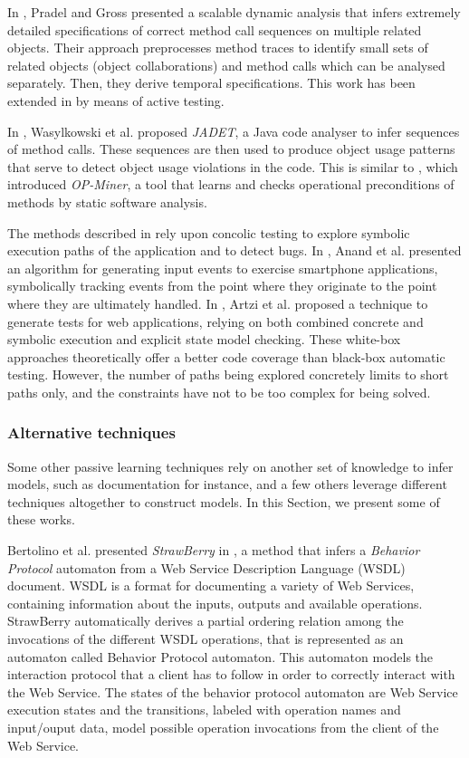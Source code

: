 In \cite{Pradel:2009}, Pradel and Gross presented a scalable
dynamic analysis that infers extremely detailed specifications of
correct method call sequences on multiple related objects. Their
approach preprocesses method traces to identify small sets of
related objects (object collaborations) and method calls which
can be analysed separately. Then, they derive temporal
specifications. This work has been extended in
\cite{Dallmeier_generatingtest} by means of active testing.

In \cite{Wasylkowski07detectingobject}, Wasylkowski et al.
proposed \textit{JADET}, a Java code analyser to infer sequences
of method calls. These sequences are then used to produce object
usage patterns that serve to detect object usage violations in
the code. This is similar to
\cite{Wasylkowski_miningoperational}, which introduced
\textit{OP-Miner}, a tool that learns and checks operational
preconditions of methods by static software analysis.

The methods described in \cite{concolicandroid12,5416728} rely
upon concolic testing to explore symbolic execution paths of the
application and to detect bugs. In \cite{concolicandroid12},
Anand et al. presented an algorithm for generating input events
to exercise smartphone applications, symbolically tracking events
from the point where they originate to the point where they are
ultimately handled. In \cite{5416728}, Artzi et al. proposed a
technique to generate tests for web applications, relying on both
combined concrete and symbolic execution and explicit state model
checking. These white-box approaches theoretically offer a better
code coverage than black-box automatic testing. However, the
number of paths being explored concretely limits to short paths
only, and the constraints have not to be too complex for being
solved.


\subsubsection{Alternative techniques}
\label{sec:passive-others}

Some other passive learning techniques rely on another set of
knowledge to infer models, such as documentation for instance,
and a few others leverage different techniques altogether to
construct models. In this Section, we present some of these
works.

Bertolino et al. presented \textit{StrawBerry} in
\cite{Bertolino:2009:ASB:1595696.1595719}, a method that infers a
\textit{Behavior Protocol} automaton from a Web Service
Description Language (WSDL) document.  WSDL is a format for
documenting a variety of Web Services, containing information
about the inputs, outputs and available operations. StrawBerry
automatically derives a partial ordering relation among the
invocations of the different WSDL operations, that is represented
as an automaton called Behavior Protocol automaton.  This
automaton models the interaction protocol that a client has to
follow in order to correctly interact with the Web Service.  The
states of the behavior protocol automaton are Web Service
execution states and the transitions, labeled with operation
names and input/ouput data, model possible operation invocations
from the client of the Web Service.

